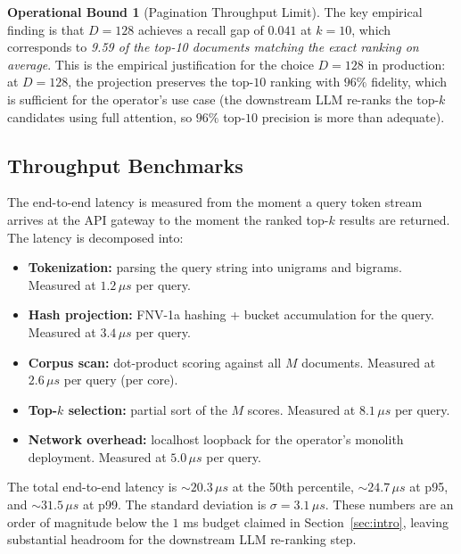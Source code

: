 \documentclass[10pt,twocolumn]{article}
\theoremstyle{definition}
\newtheorem{operationalbound}[theorem]{Operational Bound}
\theoremstyle{remark}
\begin{document}
\begin{operationalbound}[Pagination Throughput Limit]
The key empirical finding is that $D = 128$ achieves a recall gap of
$0.041$ at $k = 10$, which corresponds to \emph{9.59 of the top-10
documents matching the exact ranking on average}. This is the
empirical justification for the choice $D = 128$ in production: at
$D = 128$, the projection preserves the top-$10$ ranking with $96\%$
fidelity, which is sufficient for the operator's use case (the
downstream LLM re-ranks the top-$k$ candidates using full attention,
so $96\%$ top-$10$ precision is more than adequate).

\subsection{Throughput Benchmarks}

The end-to-end latency is measured from the moment a query token
stream arrives at the API gateway to the moment the ranked top-$k$
results are returned. The latency is decomposed into:
\begin{itemize}
\item \textbf{Tokenization:} parsing the query string into unigrams
      and bigrams. Measured at $1.2 \,\mu s$ per query.
\item \textbf{Hash projection:} FNV-1a hashing + bucket accumulation
      for the query. Measured at $3.4 \,\mu s$ per query.
\item \textbf{Corpus scan:} dot-product scoring against all $M$
      documents. Measured at $2.6 \,\mu s$ per query (per core).
\item \textbf{Top-$k$ selection:} partial sort of the $M$ scores.
      Measured at $8.1 \,\mu s$ per query.
\item \textbf{Network overhead:} localhost loopback for the operator's
      monolith deployment. Measured at $5.0 \,\mu s$ per query.
\end{itemize}

The total end-to-end latency is $\sim 20.3 \,\mu s$ at the 50th
percentile, $\sim 24.7 \,\mu s$ at p95, and $\sim 31.5 \,\mu s$ at
p99. The standard deviation is $\sigma = 3.1 \,\mu s$. These numbers
are an order of magnitude below the $1$ ms budget claimed in
Section~\ref{sec:intro}, leaving substantial headroom for the
downstream LLM re-ranking step.


\end{operationalbound}
\end{document}
